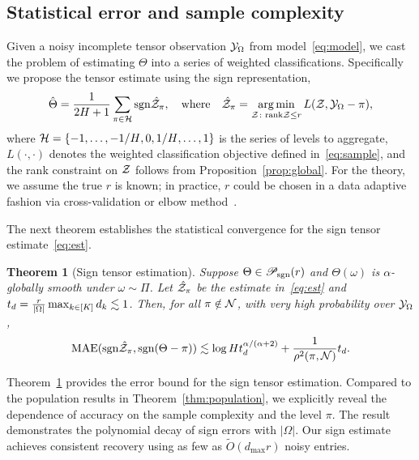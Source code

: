 \documentclass{article}
\theoremstyle{plain}
\newtheorem{thm}{Theorem}
\theoremstyle{definition}
\def\sign{\textup{sgn}}
\def\caliP{\mathscr{P}_{\textup{sgn}}}
\begin{document}
\subsection{Statistical error and sample complexity}
\vspace{-.2cm}
Given a noisy incomplete tensor observation $\mathcal{Y}_\Omega$ from model~\eqref{eq:model}, we cast the problem of estimating $\Theta$ into a series of weighted classifications. Specifically we propose the tensor estimate using the sign representation,
\begin{equation}\label{eq:est}
\hat \Theta = {1\over 2H+1}\sum_{\pi \in \tH}\sign{\hat \tZ_\pi}, \quad \text{where}\quad \hat \tZ_\pi = \argmin_{\tZ\colon \text{rank}\tZ\leq r} L(\tZ, \tY_\Omega-\pi),
\end{equation}
where %
$\mathcal{H}=\{-1,\ldots,-{1/ H}, 0, {1/H},\ldots,1\}$ is the series of levels to aggregate, 
$L(\cdot,\cdot)$ denotes the weighted classification objective defined in~\eqref{eq:sample}, 
and the rank constraint on $\mathcal{Z}$ follows from Proposition~\ref{prop:global}. For the theory, we assume the true $r$ is known; in practice, $r$ could be chosen in a data adaptive fashion via cross-validation or elbow method~\citep{hastie2009elements}. 

The next theorem establishes the statistical convergence for the sign tensor estimate~\eqref{eq:est}.

\begin{thm}[Sign tensor estimation]\label{thm:classification} Suppose $\Theta\in\caliP(r)$ and $\Theta(\omega)$ is $\alpha$-globally smooth under $\omega\sim \Pi$. Let $\hat {\mathcal{Z}}_\pi$ be the estimate in~\eqref{eq:est} and $t_d ={r\over |\Omega|}\max_{k\in[K]} d_k\lesssim 1$. Then, for all $\pi\notin\mathcal{N}$, with very high probability over $\mathcal{Y}_\Omega$, 
\begin{align}\label{eq:bound}
\textup{MAE}(\sign \hat \tZ_\pi, \sign(\Theta-\pi)) \lesssim \log H t_d^{\alpha/( \alpha+2)}+{1 \over \rho^2(\pi, \tN)}t_d.
\end{align}
\end{thm}
Theorem~\ref{thm:classification} provides the error bound for the sign tensor estimation. Compared to the population results in Theorem~\ref{thm:population}, we explicitly reveal the dependence of accuracy on the sample complexity and the level $\pi$. The result demonstrates the polynomial decay of sign errors with $|\Omega|$.  Our sign estimate achieves consistent recovery using as few as $\tilde O(d_{\max}r)$ noisy entries. 
\end{document}
